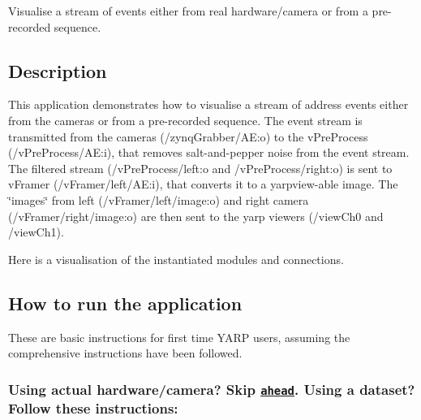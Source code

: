 Visualise a stream of events either from real hardware/camera or from a pre-\/recorded sequence.

\subsection*{Description}

This application demonstrates how to visualise a stream of address events either from the cameras or from a pre-\/recorded sequence. The event stream is transmitted from the cameras ({\ttfamily /zynq\+Grabber/\+AE\+:o}) to the v\+Pre\+Process ({\ttfamily /v\+Pre\+Process/\+AE\+:i}), that removes salt-\/and-\/pepper noise from the event stream. The filtered stream ({\ttfamily /v\+Pre\+Process/left\+:o} and {\ttfamily /v\+Pre\+Process/right\+:o}) is sent to v\+Framer ({\ttfamily /v\+Framer/left/\+AE\+:i}), that converts it to a yarpview-\/able image. The \char`\"{}images\char`\"{} from left ({\ttfamily /v\+Framer/left/image\+:o}) and right camera ({\ttfamily /v\+Framer/right/image\+:o}) are then sent to the yarp viewers ({\ttfamily /view\+Ch0} and {\ttfamily /view\+Ch1}).

Here is a visualisation of the instantiated modules and connections.



\subsection*{How to run the application}

These are basic instructions for first time Y\+A\+RP users, assuming the comprehensive instructions have been followed.

\subsubsection*{Using actual hardware/camera? Skip \href{#using-real-hardwarecamera}{\tt ahead}. Using a dataset? Follow these instructions\+:}


